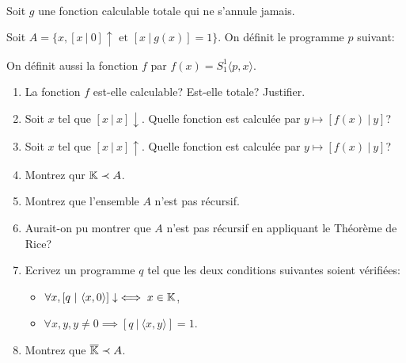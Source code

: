 \begin{td-exo}[Progressif]\,\\ %
    Soit \(g\) une fonction calculable totale qui ne s'annule jamais. 
    
    Soit \(A = \{x, [x\ |\ 0]\uparrow \text{ et } [x\ |\ g(x)] = 1\}\).
    On définit le programme \(p\) suivant:
    
    On définit aussi la fonction \(f\) par \(f(x) = S_1^1\langle p,x\rangle\).
    \begin{enumerate}
        \item La fonction \(f\) est-elle calculable? Est-elle totale? Justifier.
        \item Soit \(x\) tel que \([x\ |\ x]\downarrow\). Quelle fonction est calculée par \(y\mapsto [f(x)\ |\ y]\)?
        \item Soit \(x\) tel que \([x\ |\ x]\uparrow\). Quelle fonction est calculée par \(y\mapsto [f(x)\ |\ y]\)?
        \item Montrez qur \(\mathbb{K} \prec A\).
        \item Montrez que l'ensemble \(A\) n'est pas récursif.
        \item Aurait-on pu montrer que \(A\) n'est pas récursif en appliquant le Théorème de Rice?
        \item Ecrivez un programme \(q\) tel que les deux conditions suivantes soient vérifiées:
        \begin{itemize}
            \item \(\forall x,[q\ |\ \langle x,0\rangle]\downarrow \iff x\in\mathbb{K}\),
            \item \(\forall x,y,y\neq 0 \implies [q\ |\ \langle x,y\rangle] = 1\).
        \end{itemize}
        \item Montrez que \(\overline{\mathbb{K}}\prec A\).
    \end{enumerate}
\end{td-exo}

